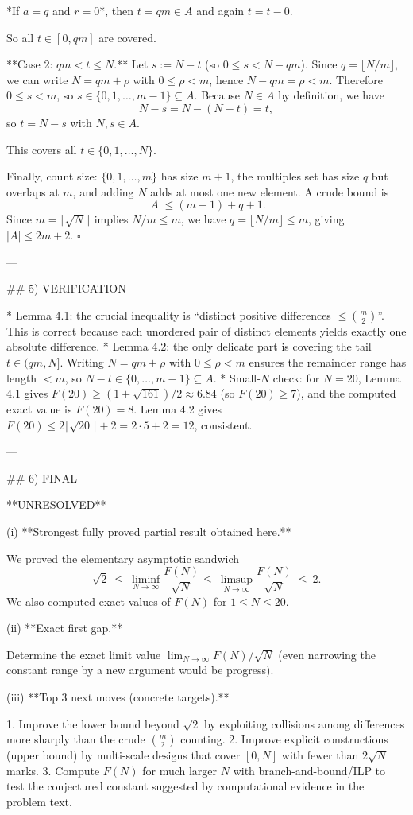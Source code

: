 *If $a=q$ and $r=0$*, then $t=qm\in A$ and again $t=t-0$.

So all $t\in[0,qm]$ are covered.

**Case 2: $qm < t\le N$.**
Let $s:=N-t$ (so $0\le s < N-qm$). Since $q=\lfloor N/m\rfloor$, we can write $N=qm+\rho$ with $0\le \rho < m$, hence $N-qm=\rho<m$. Therefore $0\le s < m$, so $s\in\{0,1,\dots,m-1\}\subseteq A$.
Because $N\in A$ by definition, we have
\[
N-s = N-(N-t)=t,
\]
so $t=N-s$ with $N,s\in A$.

This covers all $t\in\{0,1,\dots,N\}$.

Finally, count size: $\{0,1,\dots,m\}$ has size $m+1$, the multiples set has size $q$ but overlaps at $m$, and adding $N$ adds at most one new element. A crude bound is
\[
|A|\le (m+1)+q+1.
\]
Since $m=\lceil\sqrt N\rceil$ implies $N/m\le m$, we have $q=\lfloor N/m\rfloor\le m$, giving $|A|\le 2m+2$.
$\square$

---

## 5) VERIFICATION

* Lemma 4.1: the crucial inequality is “distinct positive differences $\le \binom{m}{2}$”. This is correct because each unordered pair of distinct elements yields exactly one absolute difference.
* Lemma 4.2: the only delicate part is covering the tail $t\in(qm,N]$. Writing $N=qm+\rho$ with $0\le\rho<m$ ensures the remainder range has length $<m$, so $N-t\in\{0,\dots,m-1\}\subseteq A$.
* Small-$N$ check: for $N=20$, Lemma 4.1 gives $F(20)\ge (1+\sqrt{161})/2\approx 6.84$ (so $F(20)\ge 7$), and the computed exact value is $F(20)=8$. Lemma 4.2 gives $F(20)\le 2\lceil\sqrt{20}\rceil+2=2\cdot5+2=12$, consistent.

---

## 6) FINAL

**UNRESOLVED**

(i) **Strongest fully proved partial result obtained here.**

We proved the elementary asymptotic sandwich
\[
\sqrt2\ \le\ \liminf_{N\to\infty}\frac{F(N)}{\sqrt N}
\le\ \limsup_{N\to\infty}\frac{F(N)}{\sqrt N}\ \le\ 2.
\]
We also computed exact values of $F(N)$ for $1\le N\le 20$.

(ii) **Exact first gap.**

Determine the exact limit value $\lim_{N\to\infty} F(N)/\sqrt N$ (even narrowing the constant range by a new argument would be progress).

(iii) **Top 3 next moves (concrete targets).**

1. Improve the lower bound beyond $\sqrt2$ by exploiting collisions among differences more sharply than the crude $\binom{m}{2}$ counting.
2. Improve explicit constructions (upper bound) by multi-scale designs that cover $[0,N]$ with fewer than $2\sqrt N$ marks.
3. Compute $F(N)$ for much larger $N$ with branch-and-bound/ILP to test the conjectured constant suggested by computational evidence in the problem text.

